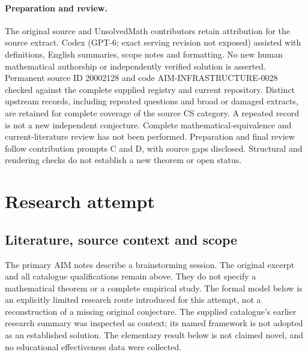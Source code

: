 \documentclass[11pt]{article}
\begin{document}
\paragraph{Preparation and review.}
The original source and UnsolvedMath contributors retain attribution for the source extract. Codex (GPT-6; exact serving revision not exposed) assisted with definitions, English summaries, scope notes and formatting. No new human mathematical authorship or independently verified solution is asserted. Permanent source ID 20002128 and code AIM-INFRASTRUCTURE-0028 checked against the complete supplied registry and current repository. Distinct upstream records, including repeated questions and broad or damaged extracts, are retained for complete coverage of the source CS category. A repeated record is not a new independent conjecture. Complete mathematical-equivalence and current-literature review has not been performed. Preparation and final review follow contribution prompts C and D, with source gaps disclosed. Structural and rendering checks do not establish a new theorem or open status.
\label{end:20002128}

\section{Research attempt}
\subsection{Literature, source context and scope}
The primary AIM notes describe a brainstorming session. The original excerpt and all catalogue qualifications remain above. They do not specify a mathematical theorem or a complete empirical study. The formal model below is an explicitly limited research route introduced for this attempt, not a reconstruction of a missing original conjecture. The supplied catalogue's earlier research summary was inspected as context; its named framework is not adopted as an established solution. The elementary result below is not claimed novel, and no educational effectiveness data were collected.
\end{document}
